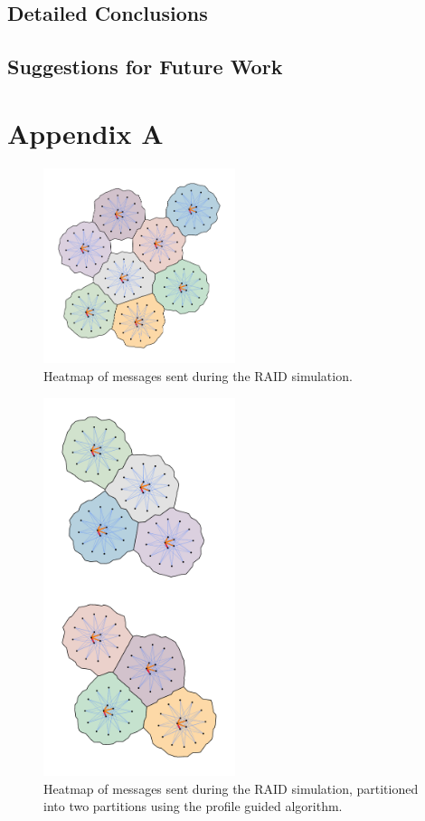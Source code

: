 \documentclass[11pt]{book}
\begin{document}
\section{Detailed Conclusions}

\section{Suggestions for Future Work}


\appendix
\chapter{Appendix A}\label{appendixA}

\begin{figure}
\centering
\includegraphics[clip=true,width=0.5\textwidth]{figs/RAID.pdf}
\caption{Heatmap of messages sent during the RAID simulation.}
\end{figure}

\begin{figure}
\centering
\includegraphics[clip=true,width=0.5\textwidth]{figs/RAID_2part.pdf}
\caption{Heatmap of messages sent during the RAID simulation, partitioned into two partitions using the profile guided algorithm.}
\end{figure}
\end{document}
